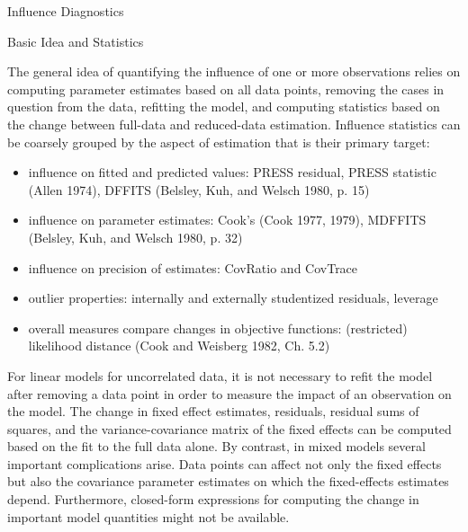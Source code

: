 Influence Diagnostics
 


Basic Idea and Statistics
 
The general idea of quantifying the influence of one or more observations relies on computing parameter estimates based on all data points, removing the cases in question from the data, refitting the model, and computing statistics based on the change between full-data and reduced-data estimation. Influence statistics can be coarsely grouped by the aspect of estimation that is their primary target: 

\begin{itemize}	
\item	influence on fitted and predicted values: PRESS residual, PRESS statistic (Allen 1974), DFFITS (Belsley, Kuh, and Welsch 1980, p. 15) 
\item	influence on parameter estimates: Cook’s (Cook 1977, 1979), MDFFITS (Belsley, Kuh, and Welsch 1980, p. 32) 
\item	influence on precision of estimates: CovRatio and CovTrace 
\item	outlier properties: internally and externally studentized residuals, leverage 
\item	overall measures compare changes in objective functions: (restricted) likelihood distance (Cook and Weisberg 1982, Ch. 5.2) 
\end{itemize}	


For linear models for uncorrelated data, it is not necessary to refit the model after removing a data point in order to measure the impact of an observation on the model. The change in fixed effect estimates, residuals, residual sums of squares, and the variance-covariance matrix of the fixed effects can be computed based on the fit to the full data alone. By contrast, in mixed models several important complications arise. Data points can affect not only the fixed effects but also the covariance parameter estimates on which the fixed-effects estimates depend. Furthermore, closed-form expressions for computing the change in important model quantities might not be available. 

